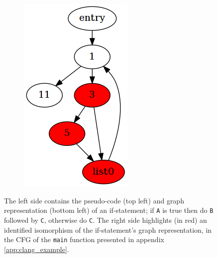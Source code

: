 \begin{figure}[htbp]
\begin{subfigure}[ht]{0.10\textwidth}
	\end{subfigure}
	\enskip
	\begin{subfigure}[ht]{0.18\textwidth}
		\includegraphics[width=\textwidth]{inc/6_design/example1_highlight.png}
	\end{subfigure}
	\caption{The left side contains the pseudo-code (top left) and graph representation (bottom left) of an if-statement; if \texttt{A} is true then do \texttt{B} followed by \texttt{C}, otherwise do \texttt{C}. The right side highlights (in red) an identified isomorphism of the if-statement's graph representation, in the CFG of the \texttt{main} function presented in appendix \ref{app:clang_example}.}
	\label{fig:representation_and_identification_of_primitive}
\end{figure}

